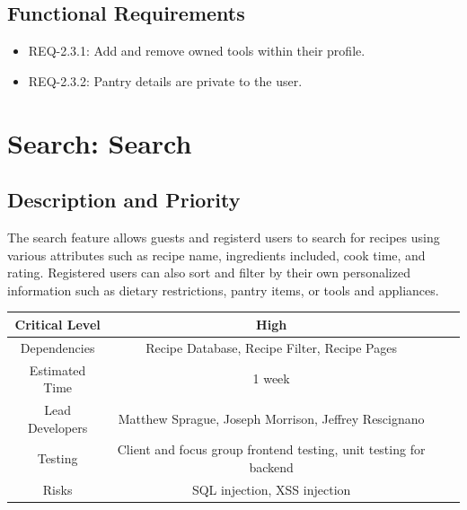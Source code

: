\documentclass{scrreprt}
\begin{document}
\subsection{\gls{Functional Requirements}}

\begin{itemize}
    \item REQ-2.3.1: Add and remove owned tools within their profile.
    \item REQ-2.3.2: Pantry details are private to the user.
\end{itemize}

\section{Search: Search}

\subsection{Description and Priority}

The search feature allows guests and registerd users to search for recipes using various attributes such as recipe name, ingredients included, cook time, and rating. Registered users can also sort and filter by their own personalized information such as dietary restrictions, pantry items, or tools and appliances.

\begin{center}
    \begin{tabular}{| c | c | c | c |}
        \hline
        Critical Level  & High                                                                 \\
        \hline
        Dependencies    & Recipe Database, Recipe Filter, Recipe Pages                         \\
        \hline
        Estimated Time  & 1 week                                                               \\
        \hline
        Lead Developers & Matthew Sprague, Joseph Morrison, Jeffrey Rescignano \\
        \hline
        Testing         & Client and focus group \gls{frontend} testing,
                          \gls{unit testing} for \gls{backend}                                 \\
        \hline
        Risks           & \gls{SQL injection}, \gls{XSS injection}                             \\
        \hline
    \end{tabular}
\end{center}
\end{document}
